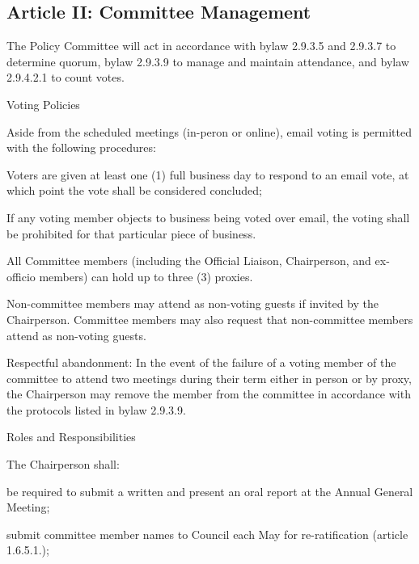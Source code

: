 \subsection{Article II: Committee Management}
\begin{longenum}[ label*=\thesubsection.\arabic*., align=left] 	
\item The Policy Committee will act in accordance with bylaw 2.9.3.5 and 2.9.3.7 to determine quorum, bylaw 2.9.3.9 to manage and maintain attendance, and bylaw 2.9.4.2.1 to count votes.
\item Voting Policies
	\begin{longenum}[label*=\arabic*., align=left]	
	\item Aside from the scheduled meetings (in-peron or online), email voting is permitted with the following procedures:
		\begin{longenum}[label*=\arabic*., align=left]		
		\item Voters are given at least one (1) full business day to respond to an email vote, at which point the vote shall be considered concluded;
		\item If any voting member objects to business being voted over email, the voting shall be prohibited for that particular piece of business.
		\end{longenum}
	\item All Committee members (including the Official Liaison, Chairperson, and ex-officio members) can hold up to three (3) proxies.
	\item Non-committee members may attend as non-voting guests if invited by the Chairperson. Committee members may also request that non-committee members attend as non-voting guests.
	\item Respectful abandonment: In the event of the failure of a voting member of the committee to attend two meetings during their term either in person or by proxy, the Chairperson may remove the member from the committee in accordance with the protocols listed in bylaw 2.9.3.9.	
	\item Roles and Responsibilities
		\begin{longenum}[label*=\arabic*., align=left]		
		\item The Chairperson shall:
			\begin{longenum}[label*=\arabic*., align=left]		
			\item be required to submit a written and present an oral report at the Annual General Meeting;
			\item submit committee member names to Council each May for re-ratification (article 1.6.5.1.);

\end{longenum}
\end{longenum}
\end{longenum}
\end{longenum}
